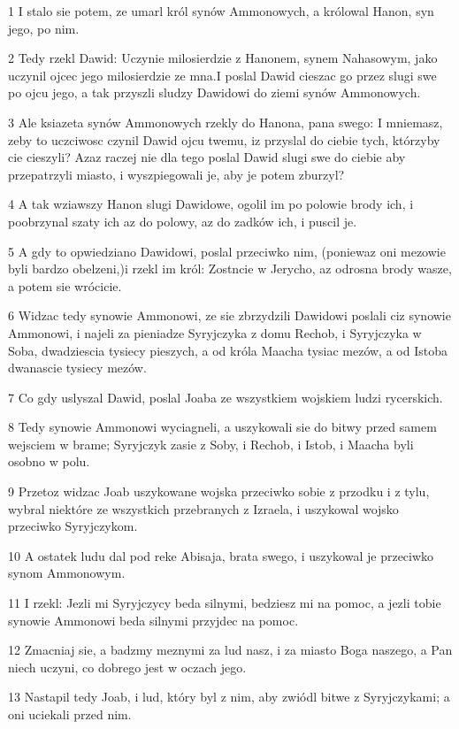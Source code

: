 \par 1 I stalo sie potem, ze umarl król synów Ammonowych, a królowal Hanon, syn jego, po nim.
\par 2 Tedy rzekl Dawid: Uczynie milosierdzie z Hanonem, synem Nahasowym, jako uczynil ojcec jego milosierdzie ze mna.I poslal Dawid cieszac go przez slugi swe po ojcu jego, a tak przyszli sludzy Dawidowi do ziemi synów Ammonowych.
\par 3 Ale ksiazeta synów Ammonowych rzekly do Hanona, pana swego: I mniemasz, zeby to uczciwosc czynil Dawid ojcu twemu, iz przyslal do ciebie tych, którzyby cie cieszyli? Azaz raczej nie dla tego poslal Dawid slugi swe do ciebie aby przepatrzyli miasto, i wyszpiegowali je, aby je potem zburzyl?
\par 4 A tak wziawszy Hanon slugi Dawidowe, ogolil im po polowie brody ich, i poobrzynal szaty ich az do polowy, az do zadków ich, i puscil je.
\par 5 A gdy to opwiedziano Dawidowi, poslal przeciwko nim, (poniewaz oni mezowie byli bardzo obelzeni,)i rzekl im król: Zostncie w Jerycho, az odrosna brody wasze, a potem sie wrócicie.
\par 6 Widzac tedy synowie Ammonowi, ze sie zbrzydzili Dawidowi poslali ciz synowie Ammonowi, i najeli za pieniadze Syryjczyka z domu Rechob, i Syryjczyka w Soba, dwadziescia tysiecy pieszych, a od króla Maacha tysiac mezów, a od Istoba dwanascie tysiecy mezów.
\par 7 Co gdy uslyszal Dawid, poslal Joaba ze wszystkiem wojskiem ludzi rycerskich.
\par 8 Tedy synowie Ammonowi wyciagneli, a uszykowali sie do bitwy przed samem wejsciem w brame; Syryjczyk zasie z Soby, i Rechob, i Istob, i Maacha byli osobno w polu.
\par 9 Przetoz widzac Joab uszykowane wojska przeciwko sobie z przodku i z tylu, wybral niektóre ze wszystkich przebranych z Izraela, i uszykowal wojsko przeciwko Syryjczykom.
\par 10 A ostatek ludu dal pod reke Abisaja, brata swego, i uszykowal je przeciwko synom Ammonowym.
\par 11 I rzekl: Jezli mi Syryjczycy beda silnymi, bedziesz mi na pomoc, a jezli tobie synowie Ammonowi beda silnymi przyjdec na pomoc.
\par 12 Zmacniaj sie, a badzmy meznymi za lud nasz, i za miasto Boga naszego, a Pan niech uczyni, co dobrego jest w oczach jego.
\par 13 Nastapil tedy Joab, i lud, który byl z nim, aby zwiódl bitwe z Syryjczykami; a oni uciekali przed nim.
